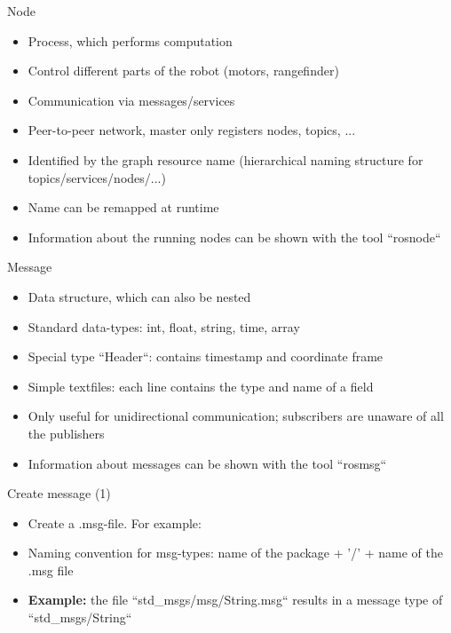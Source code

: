 \documentclass{beamer}
\begin{document}
\begin{frame}{Node}
	\begin{itemize}
		\item Process, which performs computation
		\item Control different parts of the robot (motors, rangefinder)
		\item Communication via messages/services
		\item Peer-to-peer network, master only registers nodes, topics, ...
		\item Identified by the graph resource name (hierarchical naming structure for topics/services/nodes/...)
		\item Name can be remapped at runtime
		\item Information about the running nodes can be shown with the tool ``rosnode``
	\end{itemize}
\end{frame}
\begin{frame}{Message}
	\begin{itemize}
		\item Data structure, which can also be nested
		\item Standard data-types: int, float, string, time, array
		\item Special type ``Header``: contains timestamp and coordinate frame
		\item Simple textfiles: each line contains the type and name of a field
		\item Only useful for unidirectional communication; subscribers are unaware of all the publishers
		\item Information about messages can be shown with the tool ``rosmsg``
	\end{itemize}
\end{frame}
\begin{frame}{Create message (1)}
	\begin{itemize}
		\item Create a .msg-file. For example:
		
		\item Naming convention for msg-types: name of the package + '/' + name of the .msg file\\
		\item \textbf{Example:} the file ``std\_msgs/msg/String.msg`` results in a message type of ``std\_msgs/String``
	\end{itemize}
\end{frame}
\end{document}
